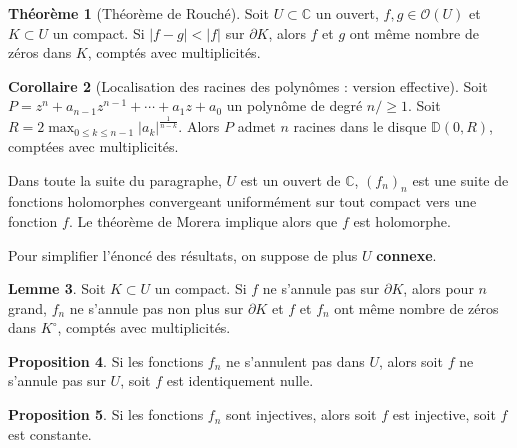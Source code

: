 \documentclass[11pt,a4paper]{article}
\newcommand{\D}{\mathbb{D}}
\newcommand{\C}{\mathbb{C}}
\theoremstyle{definition}
\newtheorem{theoreme}{Th\'eor\`eme}[section]
\newtheorem{proposition}[theoreme]{Proposition}
\newtheorem{corollaire}[theoreme]{Corollaire}
\newtheorem{lemme}[theoreme]{Lemme}
\theoremstyle{plain}
\begin{document}

\begin{theoreme}[Théorème de Rouché]
Soit $U\subset \C$ un ouvert, $f, g\in \mathcal O(U)$ et $K\subset U$ un compact.
Si $|f-g| < |f|$ sur $\partial K$, alors $f$ et $g$ ont même nombre de zéros dans $K$, comptés avec multiplicités.
\end{theoreme}




\begin{corollaire}[Localisation des racines des polynômes : version effective]
Soit $P=z^n + a_{n-1}z^{n-1}+\cdots + a_1z + a_0$ un polynôme de degré $n/\geq 1$.
Soit $R  = 2\max_{0\leq k\leq n-1} |a_k|^{\frac{1}{n-k}}$.
Alors $P$ admet $n$ racines dans le disque $\D(0,R)$, comptées avec multiplicités.
\end{corollaire}


Dans toute la suite du paragraphe, $U$ est un ouvert de $\C$, $(f_n)_n$ est une suite de fonctions holomorphes convergeant uniformément sur tout compact vers une fonction $f$.
Le théorème de Morera implique alors que $f$ est  holomorphe.

Pour simplifier l'énoncé des résultats, on suppose de plus $U$ \textbf{connexe}.

\begin{lemme}
Soit $K \subset U$ un compact. Si $f$ ne s'annule pas sur $\partial K$, alors pour $n$ grand, $f_n$ ne s'annule pas non plus sur $\partial K$ et $f$ et $f_n$ ont même nombre de zéros dans $K^\circ$, comptés avec multiplicités.
\end{lemme}

\begin{proposition}
Si les fonctions $f_n$ ne s'annulent pas dans $U$, alors soit $f$ ne s'annule pas sur $U$, soit $f$ est identiquement nulle.
\end{proposition}

\begin{proposition}
Si les fonctions $f_n$ sont injectives, alors soit $f$ est injective, soit $f$ est constante.
\end{proposition}
\end{document}
